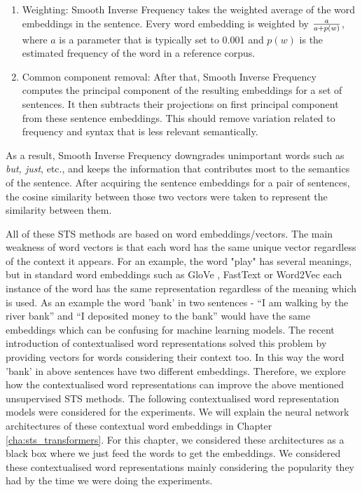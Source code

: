 \begin{enumerate}
	\item Weighting: Smooth Inverse Frequency takes the weighted average of the word embeddings in the sentence. Every word embedding is weighted by $a\over{a + p(w)}$, where $a$ is a parameter that is typically set to 0.001 and $p(w)$ is the estimated frequency of the word in a reference corpus. 
	\item Common component removal: After that, Smooth Inverse Frequency computes the principal component of the resulting embeddings for a set of sentences. It then subtracts their projections on first principal component from these sentence embeddings. This should remove variation related to frequency and syntax that is less relevant semantically.
\end{enumerate}

As a result, Smooth Inverse Frequency downgrades unimportant words such as \emph{but, just}, etc., and keeps the information that contributes most to the semantics of the sentence. After acquiring the sentence embeddings for a pair of sentences, the cosine similarity between those two vectors were taken to represent the similarity between them. 

All of these STS methods are based on word embeddings/vectors. The main weakness of word vectors is that each word has the same unique vector regardless of the context it appears. For an example, the word "play" has several meanings, but in standard word embeddings such as GloVe \cite{pennington2014glove}, FastText \cite{mikolov-etal-2018-advances} or Word2Vec  \cite{10.5555/2999792.2999959} each instance of the word has the same representation regardless of the meaning which is used. As an example the word 'bank' in two sentences - ``I am walking by the river bank'' and ``I deposited money to the bank'' would have the same embeddings which can be confusing for machine learning models. The recent introduction of contextualised word representations solved this problem by providing vectors for words considering their context too. In this way the word 'bank' in above sentences have two different embeddings. Therefore, we explore how the contextualised word representations can improve the above mentioned unsupervised STS methods. The following contextualised word representation models were considered for the experiments. We will explain the neural network architectures of these contextual word embeddings in Chapter \ref{cha:sts_transformers}. For this chapter, we considered these architectures as a black box where we just feed the words to get the embeddings. We considered these contextualised word representations mainly considering the popularity they had by the time we were doing the experiments.

